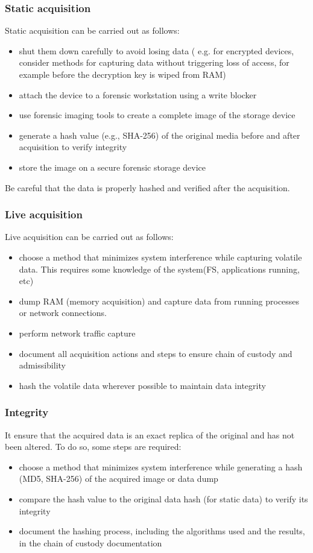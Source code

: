 \subsubsection{Static acquisition}
Static acquisition can be carried out as follows:
\begin{itemize}
  \item shut them down carefully to avoid losing data ( e.g. for
    encrypted devices, consider methods for capturing data without
    triggering loss of access, for example before the decryption key is
    wiped from RAM)
  \item attach the device to a forensic workstation using a write blocker
  \item use forensic imaging tools to create a complete image of the
    storage device
  \item generate a hash value (e.g., SHA-256) of the original media
    before and after acquisition to verify integrity
  \item store the image on a secure forensic storage device
\end{itemize}
Be careful that the data is properly hashed and verified after the
acquisition.

\subsubsection{Live acquisition}
Live acquisition can be carried out as follows:
\begin{itemize}
  \item choose a method that minimizes system interference while
    capturing volatile data. This requires some knowledge of the
    system(FS, applications running, etc)
  \item dump RAM (memory acquisition) and capture data from running
    processes or network connections.
  \item perform network traffic capture
  \item document all acquisition actions and steps to ensure chain of
    custody and admissibility
  \item hash the volatile data wherever possible to maintain data
    integrity
\end{itemize}

\subsubsection{Integrity}
It ensure that the acquired data is an exact replica of the
original and has not been altered. To do so, some steps are required:
\begin{itemize}
  \item choose a method that minimizes system interference while
    generating a hash (MD5, SHA-256) of the acquired image or data dump
  \item compare the hash value to the original data hash (for static
    data) to verify its integrity
  \item document the hashing process, including the algorithms used and
    the results, in the chain of custody documentation
\end{itemize}

